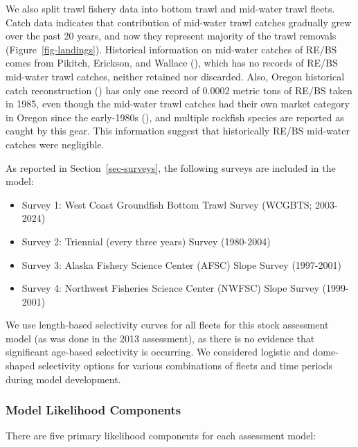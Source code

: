 \documentclass[
]{scrartcl}
\providecommand{\tightlist}{%
  \setlength{\itemsep}{0pt}\setlength{\parskip}{0pt}}\usepackage{longtable,booktabs,array}
\begin{document}
We also split trawl fishery data into bottom trawl and mid-water trawl
fleets. Catch data indicates that contribution of mid-water trawl
catches gradually grew over the past 20 years, and now they represent
majority of the trawl removals (Figure~\ref{fig-landings}). Historical
information on mid-water catches of RE/BS comes from Pikitch, Erickson,
and Wallace (), which has no
records of RE/BS mid-water trawl catches, neither retained nor
discarded. Also, Oregon historical catch reconstruction
() has only one record of 0.0002 metric tons of RE/BS taken
in 1985, even though the mid-water trawl catches had their own market
category in Oregon since the early-1980s
(), and multiple rockfish species are reported as caught by
this gear. This information suggest that historically RE/BS mid-water
catches were negligible.

As reported in Section~\ref{sec-surveys}, the following surveys are
included in the model:

\begin{itemize}
\tightlist
\item
  Survey 1: West Coast Groundfish Bottom Trawl Survey (WCGBTS;
  2003-2024)
\item
  Survey 2: Triennial (every three years) Survey (1980-2004)\\
\item
  Survey 3: Alaska Fishery Science Center (AFSC) Slope Survey
  (1997-2001)
\item
  Survey 4: Northwest Fisheries Science Center (NWFSC) Slope Survey
  (1999-2001)
\end{itemize}

We use length-based selectivity curves for all fleets for this stock
assessment model (as was done in the 2013 assessment), as there is no
evidence that significant age-based selectivity is occurring. We
considered logistic and dome-shaped selectivity options for various
combinations of fleets and time periods during model development.

\subsubsection{Model Likelihood
Components}\label{model-likelihood-components}

There are five primary likelihood components for each assessment model:
\end{document}

